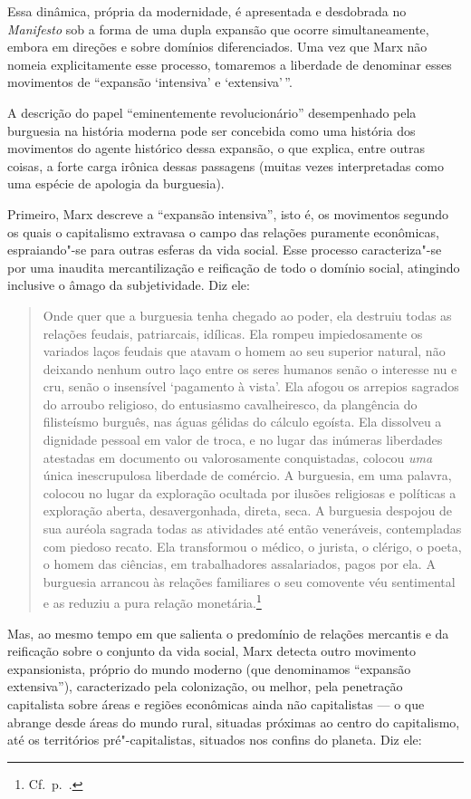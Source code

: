 Essa dinâmica, própria da modernidade, é apresentada e desdobrada no
\textit{Manifesto} sob a forma de uma dupla expansão que ocorre
simultaneamente, embora em direções e sobre domínios diferenciados. Uma
vez que Marx não nomeia explicitamente esse processo, tomaremos a
liberdade de denominar esses movimentos de “expansão ‘intensiva’ e
‘extensiva’\,”.

A descrição do papel “eminentemente revolucionário” desempenhado pela
burguesia na história moderna pode ser concebida como uma história dos
movimentos do agente histórico dessa expansão, o que explica, entre
outras coisas, a forte carga irônica dessas passagens (muitas vezes
interpretadas como uma espécie de apologia da burguesia).

Primeiro, Marx descreve a ``expansão intensiva'', isto é, os movimentos
segundo os quais o capitalismo extravasa o campo das relações puramente
econômicas, espraiando"-se para outras esferas da vida social. Esse
processo caracteriza"-se por uma inaudita mercantilização e reificação
de todo o domínio social, atingindo inclusive o âmago da subjetividade.
Diz ele: 

\begin{quote} 
Onde quer que a burguesia tenha chegado ao poder, ela destruiu todas as
relações feudais, patriarcais, idílicas. Ela rompeu impiedosamente os
variados laços feudais que atavam o homem ao seu superior natural,
não deixando nenhum outro laço entre os seres humanos senão o interesse
nu e cru, senão o insensível ‘pagamento à vista’. Ela afogou os
arrepios sagrados do arroubo religioso, do entusiasmo cavalheiresco, da
plangência do filisteísmo burguês, nas águas gélidas do cálculo
egoísta. Ela dissolveu a dignidade pessoal em valor de troca, e no
lugar das inúmeras liberdades atestadas em documento ou valorosamente
conquistadas, colocou \textit{uma} única inescrupulosa liberdade de
comércio. A burguesia, em uma palavra, colocou no lugar da exploração
ocultada por ilusões religiosas e políticas a exploração aberta,
desavergonhada, direta, seca. A burguesia despojou de sua auréola
sagrada todas as atividades até então veneráveis, contempladas com
piedoso recato. Ela transformou o médico, o jurista, o clérigo, o
poeta, o homem das ciências, em trabalhadores assalariados, pagos por ela.
A burguesia arrancou às relações familiares o seu comovente véu
sentimental e as reduziu a pura relação monetária.\footnote{ Cf.~p.~\pageref{3}.}
\end{quote} 

Mas, ao mesmo tempo em que salienta o predomínio de relações mercantis e
da reificação sobre o conjunto da vida social, Marx detecta outro
movimento expansionista, próprio do mundo moderno (que denominamos
“expansão extensiva”), caracterizado pela colonização, ou melhor, pela
penetração capitalista sobre áreas e regiões econômicas ainda não
capitalistas --- o que abrange desde áreas do mundo rural, situadas
próximas ao centro do capitalismo, até os territórios
pré"-capitalistas, situados nos confins do planeta. Diz ele:

